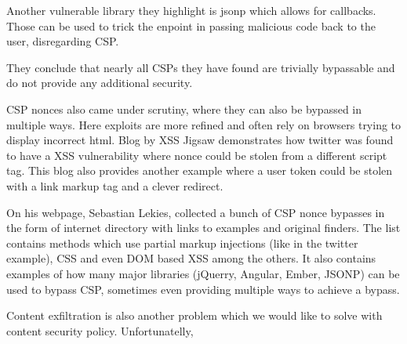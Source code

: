 \documentclass[11]{article}   %
\begin{document}
Another vulnerable library they highlight is jsonp which allows for callbacks.
Those can be used to trick the enpoint in passing malicious code back to the user, disregarding CSP.

They conclude that nearly all CSPs they have found are trivially bypassable and do not provide any additional security.

CSP nonces also came under scrutiny, where they can also be bypassed in multiple ways.
Here exploits are more refined and often rely on browsers trying to display incorrect html.
Blog by XSS Jigsaw demonstrates how twitter was found to have a XSS vulnerability where nonce could be stolen from a different script tag. \cite{noncesGoBrrr}
This blog also provides another example where a user token could be stolen with a link markup tag and a clever redirect.

On his webpage, Sebastian Lekies, collected a bunch of CSP nonce bypasses in the form of internet directory with links to examples and original finders. \cite{noncesGoExtinct}
The list contains methods which use partial markup injections (like in the twitter example), CSS and even DOM based XSS among the others.
It also contains examples of how many major libraries (jQuerry, Angular, Ember, JSONP) can be used to bypass CSP, sometimes even providing multiple ways to achieve a bypass.

Content exfiltration is also another problem which we would like to solve with content security policy.
Unfortunatelly, 



\end{document}
